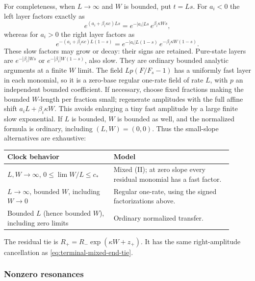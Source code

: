 For completeness, when \(L\to\infty\) and \(W\) is bounded, put
\(t=Ls\).  For \(a_i<0\) the left layer factors exactly as
\begin{equation}\label{eq:terminal-signed-slow-left}
 e^{(a_i+\beta_i\kappa c)Ls}
 =e^{-|a_i|Ls}\,e^{\beta_i\kappa Ws},
\end{equation}
whereas for \(a_i>0\) the right layer factors as
\begin{equation}\label{eq:terminal-signed-slow-right}
 e^{-(a_i+\beta_i\kappa c)L(1-s)}
 =e^{-|a_i|L(1-s)}\,e^{-\beta_i\kappa W(1-s)}.
\end{equation}
These slow factors may grow or decay: their signs are retained.  Pure-state
layers are \(e^{-|\beta_i|Ws}\) or
\(e^{-|\beta_i|W(1-s)}\), also slow.  They are ordinary bounded
analytic arguments at a finite \(W\) limit.  The field
\(Lp(F/F_s-1)\) has a uniformly fast layer in each monomial, so it is
a zero-base regular one-rate field of rate \(L\), with \(p\) an
independent bounded coefficient.  If necessary, choose fixed fractions
making the bounded \(W\)-length per fraction small; regenerate amplitudes
with the full affine shift \(a_iL+\beta_i\kappa W\).  This avoids
enlarging a tiny fast amplitude by a large finite slow exponential.
If \(L\) is bounded, \(W\) is bounded as well, and the normalized
formula is ordinary, including \((L,W)=(0,0)\).  Thus the small-slope
alternatives are exhaustive:
\begin{center}
\begin{tabular}{p{0.43\linewidth}p{0.48\linewidth}}
\hline
Clock behavior & Model \\
\hline
\(L,W\to\infty\), \(0\le\lim W/L\le c_*\)
& Mixed (II); at zero slope every residual monomial has a fast factor.\\
\(L\to\infty\), bounded \(W\), including \(W\to0\)
& Regular one-rate, using the signed factorizations above.\\
Bounded \(L\) (hence bounded \(W\)), including zero limits
& Ordinary normalized transfer.\\
\hline
\end{tabular}
\end{center}
The residual tie is
\(R_+=R_-\exp(\kappa W+z_+)\).  It has the same right-amplitude
cancellation as \eqref{eq:terminal-mixed-end-tie}.

\subsubsection{Nonzero resonances}

